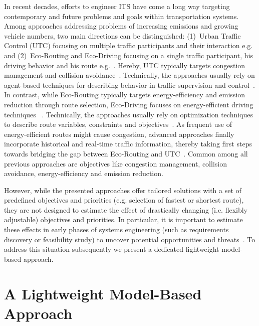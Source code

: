 \documentclass[conference]{../cls/IEEEtran}
\begin{document}
In recent decades, efforts to engineer ITS have come a long way targeting
contemporary and future problems and goals within transportation systems. Among
approaches addressing problems of increasing emissions and growing vehicle
numbers, two main directions can be distinguished: (1)~Urban Traffic Control
(UTC) focusing on multiple traffic participants and their interaction e.g.~\cite{Chen2010} and (2)~Eco-Routing and
Eco-Driving focusing on a single traffic participant, his driving behavior and
his route e.g.~\cite{Ericsson2006,Boriboonsomsin2012}. Hereby, UTC typically targets
congestion management and collision avoidance~\cite{Chen2010}. Technically, the
approaches usually rely on agent-based techniques for describing behavior
in traffic supervision and control~\cite{Chen2010}.
In contrast, while Eco-Routing typically targets energy-efficiency and emission
reduction through route selection, Eco-Driving focuses on energy-efficient
driving techniques ~\cite{Boriboonsomsin2012}.
Technically, the approaches usually rely on optimization techniques to describe route variables, constraints and objectives~\cite{Ericsson2006}. As frequent use of energy-efficient routes might cause congestion, advanced approaches finally incorporate historical and real-time traffic information, thereby taking first steps towards bridging the gap between Eco-Routing and UTC~\cite{Boriboonsomsin2012}. Common among all previous approaches are objectives like congestion management, collision avoidance, energy-efficiency and emission reduction.

However, while the presented approaches offer tailored solutions with a
set of predefined objectives and priorities (e.g. selection of fastest or
shortest route), they are not designed to estimate the effect of drastically
changing (i.e. flexibly adjustable) objectives and priorities. In particular, it
is important to estimate these effects in early phases of systems engineering (such as requirements discovery or feasibility study) to uncover potential opportunities and threats~\cite{Whitten2005}. To address this situation subsequently we present a dedicated lightweight model-based approach.

\section{A Lightweight Model-Based Approach}
\label{sec:approach}
\end{document}
